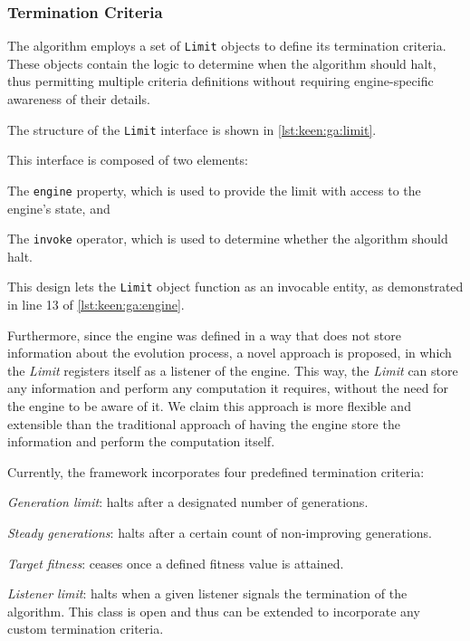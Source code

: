 \subsubsection{Termination Criteria}
  The algorithm employs a set of \texttt{Limit} objects to define its 
  termination criteria.
  These objects contain the logic to determine when the algorithm should halt, 
  thus permitting multiple criteria definitions without requiring 
  engine-specific awareness of their details.

  The structure of the \texttt{Limit} interface is shown in 
  \vref{lst:keen:ga:limit}.
  \begin{code}{Limit interface}{label={lst:keen:ga:limit}}{kotlin}      interface Limit {
    interface Limit<T, G> where G : Gene<T, G> {
        var engine: Evolver<T, G>?
        operator fun invoke(state: EvolutionState<T, G>): Boolean
    }
  \end{code}

  This interface is composed of two elements:
  \begin{enumerate*}
    \item The \texttt{engine} property, which is used to provide the limit with
      access to the engine's state, and
    \item The \texttt{invoke} operator, which is used to determine whether the
      algorithm should halt.
  \end{enumerate*}

  This design lets the \texttt{Limit} object function as an invocable entity, 
  as demonstrated in line 13 of \vref{lst:keen:ga:engine}.

  Furthermore, since the engine was defined in a way that does not store
  information about the evolution process, a novel approach is proposed, in
  which the \textit{Limit} registers itself as a listener of the engine.
  This way, the \textit{Limit} can store any information and perform any
  computation it requires, without the need for the engine to be aware of it.
  We claim this approach is more flexible and extensible than the traditional
  approach of having the engine store the information and perform the
  computation itself.

  Currently, the framework incorporates four predefined termination criteria:
  \begin{enumerate*}
  \item \emph{Generation limit}: halts after a designated number of generations.
  \item \emph{Steady generations}: halts after a certain count of 
  non-improving generations.
  \item \emph{Target fitness}: ceases once a defined fitness value is 
  attained.
  \item \emph{Listener limit}: halts when a given listener signals the
    termination of the algorithm. This class is open and thus can be extended 
    to incorporate any custom termination criteria.
  \end{enumerate*}
  